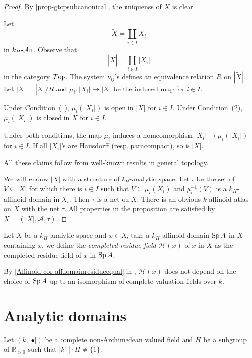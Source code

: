 \begin{proof}
    By \cref{prop-gtopsubcanonical}, the uniquenss of $X$ is clear.

    Let 
    \[
        \tilde{X}=\coprod_{i\in I}X_i  
    \]
    in $k_H\text{-}\mathcal{A}\mathrm{n}$. Observe that
    \[
        |\tilde{X}|=\coprod_{i\in I}|X_i|  
    \]
    in the category $\mathcal{T}\mathrm{op}$. The system $\nu_{ij}$'s defines an equivalence relation $R$ on $|\tilde{X}|$. Let $|X|=|\tilde{X}|/R$ and $\mu_i:|X_i|\rightarrow |X|$ be the induced map for $i\in I$.

    Under Condition~(1), $\mu_i(|X_i|)$ is open in $|X|$ for $i\in I$. Under Condition~(2), $\mu_{i}(|X_i|)$ is closed in $X$ for $i\in I$. 

    Under both conditions, the map $\mu_i$ induces a homeomorphism $|X_i|\rightarrow \mu_i(|X_i|)$ for $i\in I$. If all $|X_i|$'s are Hausdorff (resp. paracompact), so is $|X|$.

    All these claims follow from well-known results in general topology. 

    We will endow $|X|$ with a structure of $k_H$-analytic space. Let $\tau$ be the set of $V\subseteq |X|$ for which there is $i\in I$ such that $V\subseteq \mu_i(X_i)$ and $\mu_i^{-1}(V)$ is a $k_H$-affinoid domain in $X_i$. Then $\tau$ is a net on $X$. There is an obvious $k$-affinoid atlas on $X$ with the net $\tau$. All properties in the proposition are satisfied by $X=(|X|,\mathcal{A},\tau)$.
\end{proof}

\begin{definition}
    Let $X$ be a $k_H$-analytic space and $x\in X$, take a $k_H$-affinoid domain $\operatorname{Sp} A$ in $X$ containing $x$, we define the \emph{completed residue field} $\mathscr{H}(x)$ of $x$ in $X$ as the completed residue field of $x$ in $\operatorname{Sp} A$.
\end{definition}
By \cref{Affinoid-cor-affdomainresidueequal} in , $\mathscr{H}(x)$ does not depend on the choice of $\operatorname{Sp} A$ up to an isomorphism of complete valuation fields over $k$.


\section{Analytic domains}
Let $(k,|\bullet|)$ be a complete non-Archimedean valued field and $H$ be a subgroup of $\mathbb{R}_{>0}$ such that $|k^{\times}|\cdot H\neq \{1\}$.

